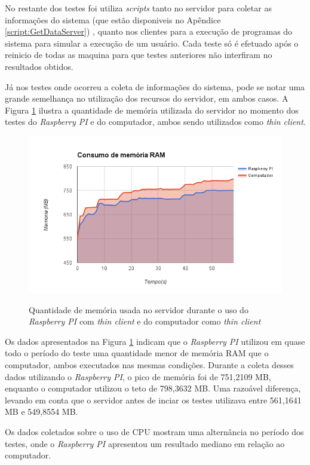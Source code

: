 \documentclass[
	12pt,				%
	openright,			%
	twoside,			%
	a4paper,			%
	chapter=TITLE,		%
	english,			%
	brazil				%
	]{abntex2}
\begin{document}
No restante dos testes foi utiliza \textit{scripts} tanto no servidor para coletar as informações do sistema (que estão disponiveis no Apêndice \ref{script:GetDataServer}) , quanto nos clientes para a execução de programas do sistema para simular a execução de um usuário. Cada teste só é efetuado após o reinicio de todas as maquina para que testes anteriores não interfiram no resultados obtidos.

Já nos testes onde ocorreu a coleta de informações do sistema, pode se notar uma grande semelhança no utilização dos recursos do servidor, em ambos casos. A Figura \ref{fig:memoria} ilustra a quantidade de memória utilizada do servidor no momento dos testes do \textit{Raspberry PI} e do computador, ambos sendo utilizados como \textit{thin client}.

\begin{figure}[!htb]
\centering
\caption{Quantidade de memória usada no servidor durante o uso do \textit{Raspberry PI} com \textit{thin client} e do computador como \textit{thin client}}
\includegraphics[scale=0.8]{Imagens/memoria}
\label{fig:memoria}
\end{figure}


Os dados apresentados na Figura \ref{fig:memoria} indicam que o \textit{Raspberry PI} utilizou em quase todo o período do teste uma quantidade menor de memória RAM que o computador, ambos executados nas mesmas condições. Durante a coleta desses dados utilizando o \textit{Raspberry PI}, o pico de memória foi de 751,2109 MB, enquanto o computador utilizou o teto de 798,3632 MB. Uma razoável diferença, levando em conta que o servidor antes de inciar os testes utilizava entre 561,1641 MB e 549,8554 MB. 

Os dados coletados sobre o  uso de CPU mostram uma alternância no período dos testes, onde o \textit{Raspberry PI} apresentou um resultado mediano em relação ao computador.
\end{document}
